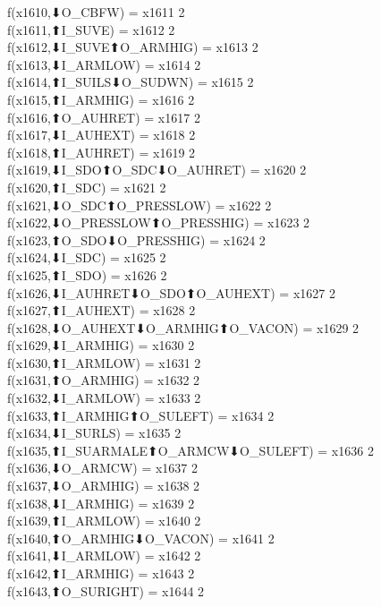 f(x1610,⬇O_CBFW) = x1611 {2} \\
f(x1611,⬆I_SUVE) = x1612 {2} \\
f(x1612,⬇I_SUVE⬆O_ARMHIG) = x1613 {2} \\
f(x1613,⬇I_ARMLOW) = x1614 {2} \\
f(x1614,⬆I_SUILS⬇O_SUDWN) = x1615 {2} \\
f(x1615,⬆I_ARMHIG) = x1616 {2} \\
f(x1616,⬆O_AUHRET) = x1617 {2} \\
f(x1617,⬇I_AUHEXT) = x1618 {2} \\
f(x1618,⬆I_AUHRET) = x1619 {2} \\
f(x1619,⬇I_SDO⬆O_SDC⬇O_AUHRET) = x1620 {2} \\
f(x1620,⬆I_SDC) = x1621 {2} \\
f(x1621,⬇O_SDC⬆O_PRESSLOW) = x1622 {2} \\
f(x1622,⬇O_PRESSLOW⬆O_PRESSHIG) = x1623 {2} \\
f(x1623,⬆O_SDO⬇O_PRESSHIG) = x1624 {2} \\
f(x1624,⬇I_SDC) = x1625 {2} \\
f(x1625,⬆I_SDO) = x1626 {2} \\
f(x1626,⬇I_AUHRET⬇O_SDO⬆O_AUHEXT) = x1627 {2} \\
f(x1627,⬆I_AUHEXT) = x1628 {2} \\
f(x1628,⬇O_AUHEXT⬇O_ARMHIG⬆O_VACON) = x1629 {2} \\
f(x1629,⬇I_ARMHIG) = x1630 {2} \\
f(x1630,⬆I_ARMLOW) = x1631 {2} \\
f(x1631,⬆O_ARMHIG) = x1632 {2} \\
f(x1632,⬇I_ARMLOW) = x1633 {2} \\
f(x1633,⬆I_ARMHIG⬆O_SULEFT) = x1634 {2} \\
f(x1634,⬇I_SURLS) = x1635 {2} \\
f(x1635,⬆I_SUARMALE⬆O_ARMCW⬇O_SULEFT) = x1636 {2} \\
f(x1636,⬇O_ARMCW) = x1637 {2} \\
f(x1637,⬇O_ARMHIG) = x1638 {2} \\
f(x1638,⬇I_ARMHIG) = x1639 {2} \\
f(x1639,⬆I_ARMLOW) = x1640 {2} \\
f(x1640,⬆O_ARMHIG⬇O_VACON) = x1641 {2} \\
f(x1641,⬇I_ARMLOW) = x1642 {2} \\
f(x1642,⬆I_ARMHIG) = x1643 {2} \\
f(x1643,⬆O_SURIGHT) = x1644 {2} \\
